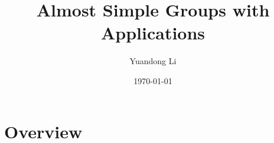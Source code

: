 \documentclass[a4,11pt]{article}
\title{Almost Simple Groups with Applications}
\author{Yuandong Li}
\date{\today}
\begin{document}
\maketitle

\tableofcontents

\section{Overview}
\end{document}
